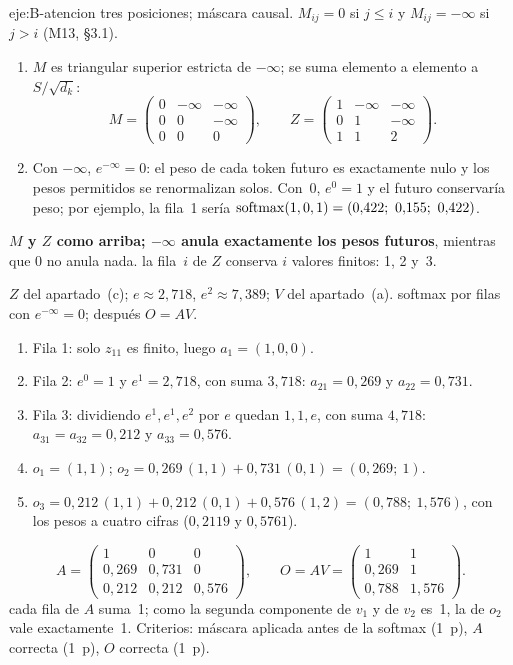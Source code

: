 \begin{solucion}{eje:B-atencion}
\datos tres posiciones; máscara causal.
\planteamiento $M_{ij}=0$ si $j\le i$ y $M_{ij}=-\infty$ si $j>i$ (M13, §3.1).
\pasos
\begin{enumerate}[label=\arabic*.]
  \item $M$ es triangular superior estricta de $-\infty$; se suma elemento a elemento a $S/\sqrt{d_k}$:
  \[
  M=\begin{pmatrix}0&-\infty&-\infty\\0&0&-\infty\\0&0&0\end{pmatrix},\qquad
  Z=\begin{pmatrix}1&-\infty&-\infty\\0&1&-\infty\\1&1&2\end{pmatrix}.
  \]
  \item Con $-\infty$, $e^{-\infty}=0$: el peso de cada token futuro es exactamente nulo y los pesos permitidos se renormalizan solos. Con~$0$, $e^{0}=1$ y el futuro conservaría peso; por ejemplo, la fila~1 sería $\softmax(1,0,1)=(0{,}422;\allowbreak\ 0{,}155;\allowbreak\ 0{,}422)$.
\end{enumerate}
\resultado \textbf{$M$ y $Z$ como arriba; $-\infty$ anula exactamente los pesos futuros}, mientras que $0$ no anula nada.
\comprobacion la fila~$i$ de $Z$ conserva $i$ valores finitos: 1, 2 y~3.

\datos $Z$ del apartado~(c); $e\approx 2{,}718$, $e^{2}\approx 7{,}389$; $V$ del apartado~(a).
\planteamiento softmax por filas con $e^{-\infty}=0$; después $O=AV$.
\pasos
\begin{enumerate}[label=\arabic*.]
  \item Fila 1: solo $z_{11}$ es finito, luego $a_1=(1,0,0)$.
  \item Fila 2: $e^{0}=1$ y $e^{1}=2{,}718$, con suma $3{,}718$: $a_{21}=0{,}269$ y $a_{22}=0{,}731$.
  \item Fila 3: dividiendo $e^{1},e^{1},e^{2}$ por $e$ quedan $1,1,e$, con suma $4{,}718$: $a_{31}=a_{32}=0{,}212$ y $a_{33}=0{,}576$.
  \item $o_1=(1,1)$; $o_2=0{,}269\,(1,1)+0{,}731\,(0,1)=(0{,}269;\allowbreak\ 1)$.
  \item $o_3=0{,}212\,(1,1)+0{,}212\,(0,1)+0{,}576\,(1,2)=(0{,}788;\allowbreak\ 1{,}576)$, con los pesos a cuatro cifras ($0{,}2119$ y $0{,}5761$).
\end{enumerate}
\resultado
\[
A=\begin{pmatrix}1&0&0\\0{,}269&0{,}731&0\\0{,}212&0{,}212&0{,}576\end{pmatrix},\qquad
O=AV=\begin{pmatrix}1&1\\0{,}269&1\\0{,}788&1{,}576\end{pmatrix}.
\]
\comprobacion cada fila de $A$ suma~1; como la segunda componente de $v_1$ y de $v_2$ es~1, la de $o_2$ vale exactamente~1. Criterios: máscara aplicada antes de la softmax (1~p), $A$ correcta (1~p), $O$ correcta (1~p).


\end{solucion}

